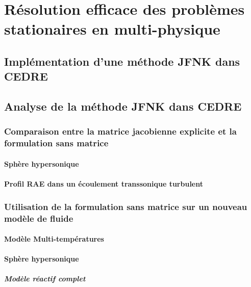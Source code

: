 


\maketitle
\tableofcontents
{}





\part{Résolution efficace des problèmes stationaires en multi-physique}

  

  \chapter{Implémentation d'une méthode JFNK dans CEDRE}

  \chapter{Analyse de la méthode JFNK dans CEDRE}
    \section{Comparaison entre la matrice jacobienne explicite et la formulation sans matrice}
      \subsection{Sphère hypersonique}
      \subsection{Profil RAE dans un écoulement transsonique turbulent}
    \section{Utilisation de la formulation sans matrice sur un nouveau modèle de fluide}
      \subsection{Modèle Multi-températures}
      \subsection{Sphère hypersonique}
        \subsubsection{Modèle réactif complet}
